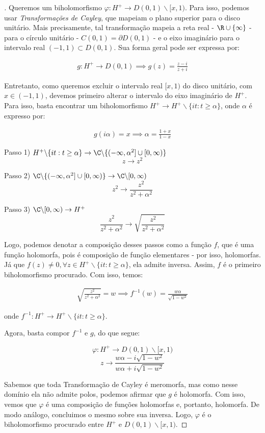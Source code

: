 \begin{proof}[]

Queremos um biholomorfismo $ \varphi: H^{+} \to D(0,1)\backslash[x,1)$. Para isso, podemos usar \textit{Transformações de Cayley}, que mapeiam o plano superior para o disco unitário. Mais precisamente, tal transformação mapeia a reta real - $ \R \cup \{\infty\} $ - para o círculo unitário - $ C(0,1) = \partial D(0,1) $ - e o eixo imaginário para o intervalo real $ (-1,1) \subset D(0,1) $. Sua forma geral pode ser expressa por:

\begin{align*}
    g: H^{+} \to D(0,1) \implies g(z) = \frac{z-i}{z+i}
\end{align*}

Entretanto, como queremos excluir o intervalo real $[x,1)$ do disco unitário, com $x \in (-1,1)$, devemos primeiro alterar o intervalo do eixo imaginário de $H^{+}$. Para isso, basta encontrar um biholomorfismo $H^{+} \to H^{+}\backslash\{it: t \geq \alpha\}$, onde $\alpha$ é expresso por:

\begin{align*}
    g(i\alpha) = x \implies \alpha = \frac{1+x}{1-x}
\end{align*}

Passo 1) $H^{+}\backslash\{it: t \geq \alpha\} \to \C\backslash\{(-\infty,\alpha^2] \cup [0,\infty)\}$ 
\[ z \to z^2 \]

Passo 2) $\C\backslash\{(-\infty,\alpha^2] \cup [0,\infty)\} \to \C\backslash[0,\infty)$
\[ z^2 \to \frac{z^2}{z^2+\alpha^2} \]

Passo 3) $\C\backslash[0,\infty) \to H^{+}$
\[ \frac{z^2}{z^2+\alpha^2} \to \sqrt{\frac{z^2}{z^2+\alpha^2}} \]

Logo, podemos denotar a composição desses passos como a função $f$, que é uma função holomorfa, pois é composição de função elementares - por isso, holomorfas. Já que $f(z) \neq 0, \forall z \in H^{+}\backslash\{it: t\geq \alpha\}$, ela admite inversa. Assim, $f$ é o primeiro biholomorfismo procurado. Com isso, temos:

\begin{align*}
    \sqrt{\frac{z^2}{z^2+\alpha^2}} = w \implies f^{-1}(w)=\frac{w\alpha}{\sqrt{1-w^2}}
\end{align*}

onde $f^{-1}: H^{+} \to H^{+}\backslash\{it: t\geq\alpha\}$.

Agora, basta compor $f^{-1}$ e $g$, do que segue:

\[ \varphi: H^{+} \to D(0,1)\backslash[x,1) \]
\[ z \to  \frac{w\alpha-i\sqrt{1-w^2}}{w\alpha+i\sqrt{1-w^2}}\]

Sabemos que toda Transformação de Cayley é meromorfa, mas como nesse domínio ela não admite polos, podemos afirmar que $g$ é holomorfa. Com isso, vemos que $\varphi$ é uma composição de funções holomorfas e, portanto, holomorfa. De modo análogo, concluimos o mesmo sobre sua inversa. Logo, $\varphi$ é o biholomorfismo procurado entre $H^{+}$ e $D(0,1)\backslash[x,1)$.

\end{proof}